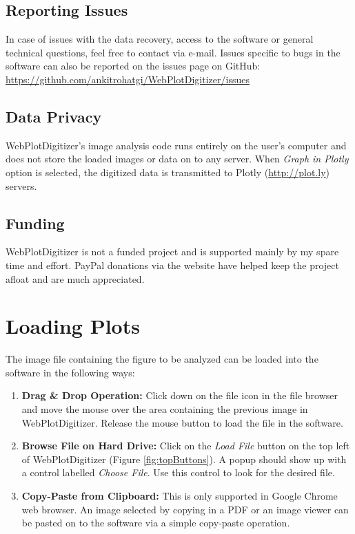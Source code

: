 \documentclass[letterpaper, 10pt]{article}
\begin{document}
\subsection{Reporting Issues}
In case of issues with the data recovery, access to the software or general technical questions, feel free to contact via e-mail. Issues specific to bugs in the software can also be reported on the issues page on GitHub: \url{https://github.com/ankitrohatgi/WebPlotDigitizer/issues}

\subsection{Data Privacy}
WebPlotDigitizer's image analysis code runs entirely on the user's computer and does not store the loaded images or data on to any server. When \emph{Graph in Plotly} option is selected, the digitized data is transmitted to Plotly (\url{http://plot.ly}) servers.

\subsection{Funding}
WebPlotDigitizer is not a funded project and is supported mainly by my spare time and effort. PayPal donations via the website have helped keep the project afloat and are  much appreciated.

\section{Loading Plots}
The image file containing the figure to be analyzed can be loaded into the software in the following ways:
\begin{enumerate}
\item{{\bf Drag \& Drop Operation:} Click down on the file icon in the file browser and move the mouse over the area containing the previous image in WebPlotDigitizer. Release the mouse button to load the file in the software.}
\item{{\bf Browse File on Hard Drive:} Click on the \emph{Load File} button on the top left of WebPlotDigitizer (Figure \ref{fig:topButtons}). A popup should show up with a control labelled \emph{Choose File}. Use this control to look for the desired file.}
\item{{\bf Copy-Paste from Clipboard:} This is only supported in Google Chrome web browser. An image selected by copying in a PDF or an image viewer can be pasted on to the software via a simple copy-paste operation.}
\end{enumerate}
\end{document}
